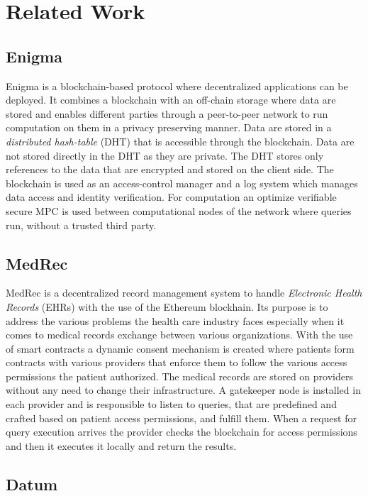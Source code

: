 \chapter{Related Work}
\label{related_work}

\section{Enigma}
\label{rel_work:enigma}

Enigma is a blockchain-based protocol where decentralized applications can be deployed. It combines a blockchain with an off-chain storage where data are stored and enables different parties through a peer-to-peer network to run computation on them in a privacy preserving manner. Data are stored in a \textit{distributed hash-table} (DHT) that is accessible through the blockchain. Data are not stored directly in the DHT as they are private. The DHT stores only references to the data that are encrypted and stored on the client side. The blockchain is used as an access-control manager and a log system which manages data access and identity verification. For computation an optimize verifiable secure MPC is used between computational nodes of the network where queries run, without a trusted third party.

\section{MedRec}
\label{rel_work:medrec}

MedRec is a decentralized record management system to handle \textit{Electronic Health Records} (EHRs) with the use of the Ethereum blockhain. Its purpose is to address the various problems the health care industry faces especially when it comes to medical records exchange between various organizations. With the use of smart contracts a dynamic consent mechanism is created where patients form contracts with various providers that enforce them to follow the various access permissions the patient authorized. The medical records are stored on providers without any need to change their infrastructure. A gatekeeper node is installed in each provider and is responsible to listen to queries, that are predefined and crafted based on patient access permissions, and fulfill them. When a request for query execution arrives the provider checks the blockchain for access permissions and then it executes it locally and return the results.

\section{Datum}
\label{rel_work:datum}

